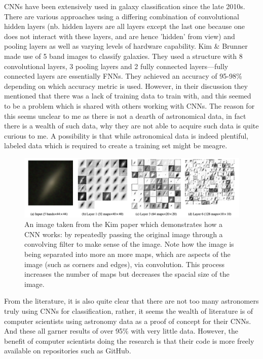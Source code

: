\documentclass[a4paper,11pt]{article}
\begin{document}
CNNs have been extensively used in galaxy classification since the late 2010s. There are various approaches using a differing combination of convolutional hidden layers (nb. hidden layers are all layers except the last one because one does not interact with these layers, and are hence 'hidden' from view) and pooling layers as well as varying levels of hardware capability. Kim \& Brunner \cite{kim_2016_stargalaxy} made use of 5 band images to classify galaxies. They used a structure with 8 convolutional layers, 3 pooling layers and 2 fully connected layers—fully connected layers are essentially FNNs. They achieved an accuracy of 95-98\% depending on which accuracy metric is used. However, in their discussion they mentioned that there was a lack of training data to train with, and this seemed to be a problem which is shared with others working with CNNs. \cite{khalifanoureldeenm_2017_deep} \cite{aniyan_2017_classifying} The reason for this seems unclear to me as there is not a dearth of astronomical data, in fact there is a wealth of such data, why they are not able to acquire such data is quite curious to me. A possibility is that while astronomical data is indeed plentiful, labeled data which is required to create a training set might be meagre. 
\begin{figure}[ht]
\centering
\includegraphics[width=\textwidth]{CNNExample.png}
\caption{\label{fig:CNNExample}An image taken from the Kim paper which demonstrates how a CNN works: by repeatedly passing the original image through a convolving filter to make sense of the image. Note how the image is being separated into more an more maps, which are aspects of the image (such as corners and edges), via convolution. This process increases the number of maps but decreases the spacial size of the image. \cite{kim_2016_stargalaxy}}
\end{figure}

From the literature, it is also quite clear that there are not too many astronomers truly using CNNs for classification, rather, it seems the wealth of literature is of computer scientists using astronomy data as a proof of concept for their CNNs. \cite{khalifanoureldeenm_2017_deep} And these all garner results of over 95\% with very little data. However, the benefit of computer scientists doing the research is that their code is more freely available on repositories such as GitHub.
\end{document}
